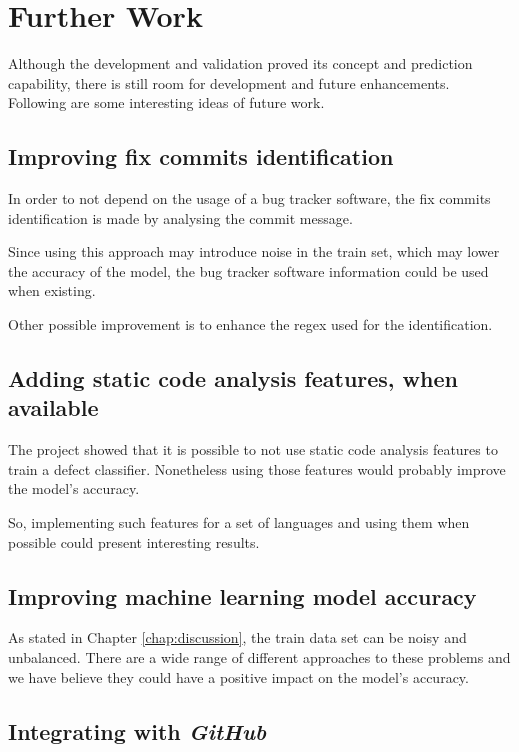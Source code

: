 \section{Further Work}

Although the development and validation proved its concept and prediction capability, there is still room for development and future enhancements. Following are
some interesting ideas of future work.

\subsection{Improving fix commits identification}

In order to not depend on the usage of a bug tracker software, the fix commits identification is made by analysing the commit message. 

Since using this approach may introduce noise in the train set, which may lower the accuracy of the model, the bug tracker software information could be used when existing.

Other possible improvement is to enhance the regex used for the identification.

\subsection{Adding static code analysis features, when available}

The project showed that it is possible to not use static code analysis features to train a defect classifier. Nonetheless using those features would probably improve the model's accuracy. 

So, implementing such features for a set of languages and using them when possible could present interesting results.

\subsection{Improving machine learning model accuracy}

As stated in Chapter \ref{chap:discussion}, the train data set can be noisy and unbalanced. There are a wide range of different approaches to these problems and we have believe they could have a positive impact on the model's accuracy.

\subsection{Integrating with \emph{GitHub}}

